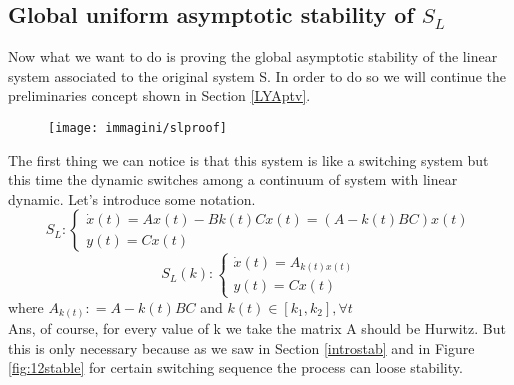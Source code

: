 \subsection{Global uniform asymptotic stability of $S_L$}
Now what we want to do is proving the global asymptotic stability of the linear system associated to the original system S. In order to do so we will continue the preliminaries concept shown in Section \ref{LYAptv}.
\begin{figure}[H]
	\centering
	\texttt{[image: immagini/slproof]}
	\label{fig:slproof}
\end{figure}
The first thing we can notice is that this system is like a switching system but this time the dynamic switches among a continuum of  system with linear dynamic. Let's introduce some notation.
\[S_L\colon \begin{cases}
	\dot{x}(t)=Ax(t)-Bk(t)Cx(t)=(A-k(t)BC)x(t)\\
	y(t)=Cx(t)
\end{cases}
\]
\[S_L(k)\colon \begin{cases}
	\dot{x}(t)=A_{k(t)x(t)}\\
	y(t)=Cx(t)
\end{cases}
\]
where $A_{k(t)}\colon=A-k(t)BC$ and $k(t) \in [k_1,k_2],\forall t$ \\
Ans, of course, for every value of k we take the matrix A should be Hurwitz. But this is only necessary because as we saw in Section \ref{introstab} and in Figure \ref{fig:12stable} for certain switching sequence the process can loose stability.
